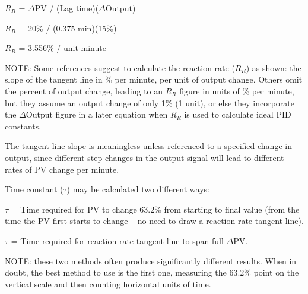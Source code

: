 $R_R$ = $\Delta$PV / (Lag time)($\Delta$Output)

$R_R$ = 20\% / (0.375 min)(15\%)

$R_R$ = 3.556\% / unit-minute
 
\vskip 10pt
 
NOTE: Some references suggest to calculate the reaction rate ($R_R$) as shown: the slope of the tangent line in \% per minute, per unit of output change.  Others omit the percent of output change, leading to an $R_R$ figure in units of \% per minute, but they assume an output change of only 1\% (1 unit), or else they incorporate the $\Delta$Output figure in a later equation when $R_R$ is used to calculate ideal PID constants.  

The tangent line slope is meaningless unless referenced to a specified change in output, since different step-changes in the output signal will lead to different rates of PV change per minute.

\vskip 10pt


Time constant ($\tau$) may be calculated two different ways:
 
\vskip 10pt

$\tau$ = Time required for PV to change 63.2\% from starting to final value (from the time the PV first starts to change -- no need to draw a reaction rate tangent line).
 
\vskip 10pt

$\tau$ = Time required for reaction rate tangent line to span full $\Delta$PV.

\vskip 10pt

NOTE: these two methods often produce significantly different results.  When in doubt, the best method to use is the first one, measuring the 63.2\% point on the vertical scale and then counting horizontal units of time.




